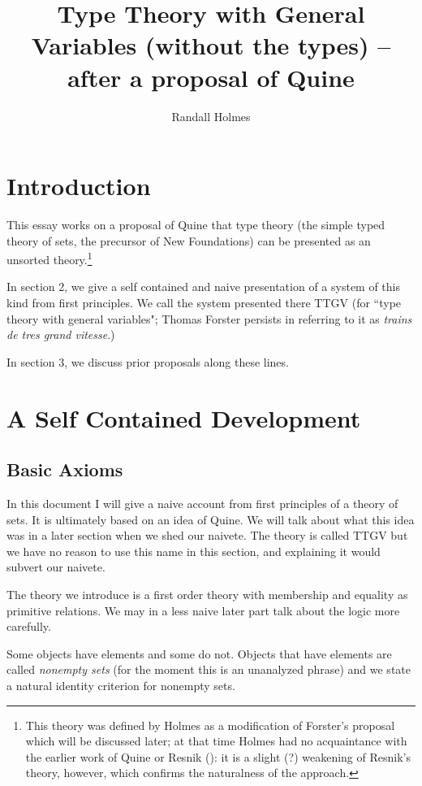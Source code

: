 \documentclass[12pt]{article}
\title{Type Theory with General Variables (without the types) -- after a proposal of Quine}
\author{Randall Holmes}
\begin{document}
\maketitle

\section{Introduction}

This essay works on a proposal of Quine that type theory (the simple typed theory of sets, the precursor of New Foundations) can be presented as an unsorted theory.\footnote{This theory was defined by Holmes as a modification of Forster's proposal which will be discussed later; at that time Holmes had no acquaintance with the earlier work of Quine or Resnik (\cite{resnikttgv}):  it is a slight (?) weakening of Resnik's theory, however, which confirms the naturalness of the approach.}

In section 2, we give a self contained and naive presentation of a system of this kind from first principles.  We call the system presented there TTGV (for ``type theory with general variables";  Thomas Forster persists in referring to it as {\em trains de tres grand vitesse\/}.)

In section 3, we discuss prior proposals along these lines.

\section{A Self Contained Development}

\subsection{Basic Axioms}

In this document I will give a naive account from first principles of a theory of sets.  It is ultimately based on an idea of Quine.  We will talk about what this idea was in a later section when we shed our naivete.  The theory is called TTGV but we have no reason to use this name in this section, and explaining it would subvert our naivete.

The theory we introduce is a first order theory with membership and equality as primitive relations.  We may in a less naive later part talk about the logic more carefully.

Some objects have elements and some do not.  Objects that have elements are called {\em nonempty sets\/} (for the moment this is an unanalyzed phrase) and we state a natural identity criterion for nonempty sets.
\end{document}
